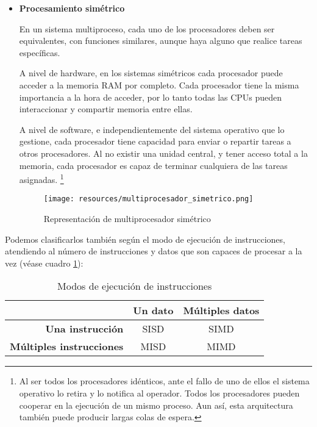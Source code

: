 \documentclass[a4paper, 11pt, titlepage]{article}
\begin{document}
\begin{itemize}
            \item \textbf{Procesamiento simétrico}
            
            En un sistema multiproceso, cada uno de los procesadores deben ser equivalentes,
            con funciones similares, aunque haya alguno que realice tareas específicas.

            A nivel de hardware, en los sistemas simétricos cada procesador puede acceder a 
            la memoria RAM por completo. Cada procesador tiene la misma importancia a la hora
            de acceder, por lo tanto todas las CPUs pueden interaccionar y compartir memoria 
            entre ellas.
            
            A nivel de software, e independientemente del sistema operativo que lo gestione, 
            cada procesador tiene capacidad para enviar o repartir tareas a otros procesadores. 
            Al no existir una unidad central, y tener acceso total a la memoria, cada procesador 
            es capaz de terminar cualquiera de las tareas asignadas. \footnote{
                Al ser todos los procesadores idénticos, ante el fallo de uno de ellos el sistema 
                operativo lo retira y lo notifica al operador. Todos los procesadores pueden cooperar
                en la ejecución de un mismo proceso. Aun así, esta arquitectura también puede producir 
                largas colas de espera.
            }

            \begin{figure}[htp]
                \centering
                \texttt{[image: resources/multiprocesador\_simetrico.png]}
                \caption{Representación de multiprocesador simétrico}
                \label{multiprocesador_simetrico}
            \end{figure}
        \end{itemize}

        Podemos clasificarlos también según el modo de ejecución de instrucciones, atendiendo al 
        número de instrucciones y datos que son capaces de procesar a la vez (véase cuadro 
        \ref{modoejecucioninstrucciones}):

        \begin{table}[htp]
            \centering
            \caption{Modos de ejecución de instrucciones}
            \label{modoejecucioninstrucciones}
            \begin{tabular}{rcc}
                & \textbf{Un dato} & \textbf{Múltiples datos} \\ \hline
                \textbf{Una instrucción} & SISD & SIMD \\ \hline
                \textbf{Múltiples instrucciones} & MISD & MIMD \\ \hline
            \end{tabular}
        \end{table}
\end{document}
